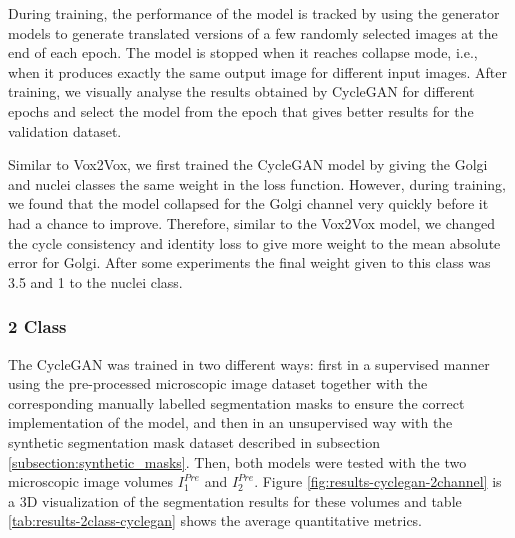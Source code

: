 During training, the performance of the model is tracked by using the generator models to generate translated versions of a few randomly selected images at the end of each epoch. The model is stopped when it reaches collapse mode, i.e., when it produces exactly the same output image for different input images. After training, we visually analyse the results obtained by CycleGAN for different epochs and select the model from the epoch that gives better results for the validation dataset.

Similar to Vox2Vox, we first trained the CycleGAN model by giving the Golgi and nuclei classes the same weight in the loss function. However, during training, we found that the model collapsed for the Golgi channel very quickly before it had a chance to improve. Therefore, similar to the Vox2Vox model, we changed the cycle consistency and identity loss to give more weight to the mean absolute error for Golgi. After some experiments the final weight given to this class was 3.5 and 1 to the nuclei class.


\subsubsection*{2 Class}

The CycleGAN was trained in two different ways: first in a supervised manner using the pre-processed microscopic image dataset together with the corresponding manually labelled segmentation masks to ensure the correct implementation of the model, and then in an unsupervised way with the synthetic segmentation mask dataset described in subsection \ref{subsection:synthetic_masks}. Then, both models were tested with the two microscopic image volumes $I^{Pre}_1$ and $I^{Pre}_2$. Figure \ref{fig:results-cyclegan-2channel} is a 3D visualization of the segmentation results for these volumes and table \ref{tab:results-2class-cyclegan} shows the average quantitative metrics.

\begin{table}[!htb]
\centering
\caption{Average metric values obtained from training the 2 class CycleGAN model in supervised and unsupervised way and testing these models on two pre-processed microscopic images}
\label{tab:results-2class-cyclegan}
\end{table}

